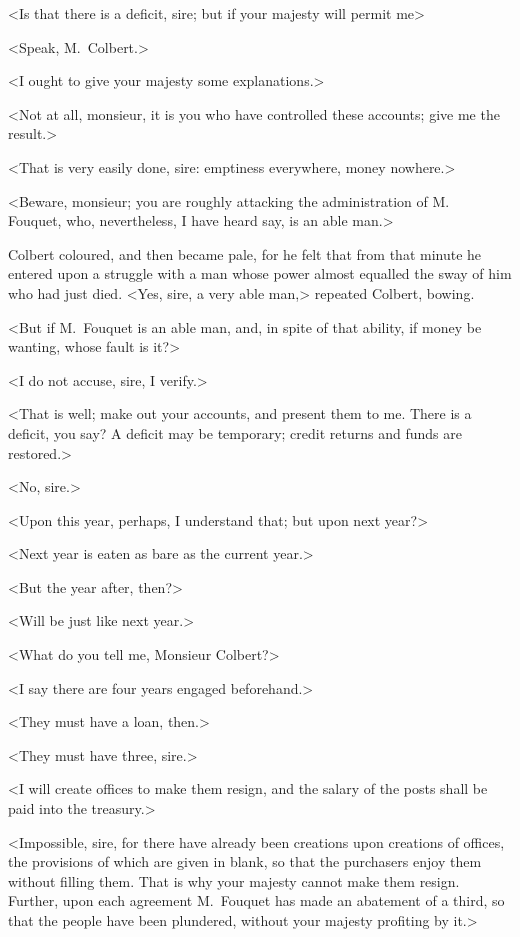 <Is that there is a deficit, sire; but if your majesty will permit me\longdash>

<Speak, M.~Colbert.>

<I ought to give your majesty some explanations.>

<Not at all, monsieur, it is you who have controlled these accounts; give me the result.>

<That is very easily done, sire: emptiness everywhere, money nowhere.>

<Beware, monsieur; you are roughly attacking the administration of M.~ Fouquet, who, nevertheless, I have heard say, is an able man.>

Colbert coloured, and then became pale, for he felt that from that minute he entered upon a struggle with a man whose power almost equalled the sway of him who had just died. <Yes, sire, a very able man,> repeated Colbert, bowing.

<But if M.~Fouquet is an able man, and, in spite of that ability, if money be wanting, whose fault is it?>

<I do not accuse, sire, I verify.>

<That is well; make out your accounts, and present them to me. There is a deficit, you say? A deficit may be temporary; credit returns and funds are restored.>

<No, sire.>

<Upon this year, perhaps, I understand that; but upon next year?>

<Next year is eaten as bare as the current year.>

<But the year after, then?>

<Will be just like next year.>

<What do you tell me, Monsieur Colbert?>

<I say there are four years engaged beforehand.>

<They must have a loan, then.>

<They must have three, sire.>

<I will create offices to make them resign, and the salary of the posts shall be paid into the treasury.>

<Impossible, sire, for there have already been creations upon creations of offices, the provisions of which are given in blank, so that the purchasers enjoy them without filling them. That is why your majesty cannot make them resign. Further, upon each agreement M.~Fouquet has made an abatement of a third, so that the people have been plundered, without your majesty profiting by it.>

